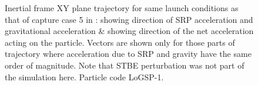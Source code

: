 \begin{figure}[htb]
\caption{Inertial frame XY plane trajectory for same launch conditions as that of capture case 5 in : \protect{} showing direction of \gls{SRP} acceleration and gravitational acceleration \& \protect{} showing direction of the net acceleration acting on the particle. Vectors are shown only for those parts of trajectory where acceleration due to \gls{SRP} and gravity have the same order of magnitude. Note that \gls{STBE} perturbation was not part of the simulation here. Particle code LoGSP-1.}
\end{figure}
\FloatBarrier
